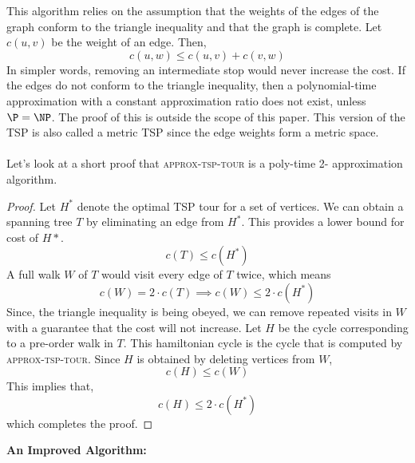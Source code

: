 \documentclass[11pt]{article}
\begin{document}
  This algorithm relies on the assumption that the weights of the edges of the graph conform to the triangle inequality and that the graph is complete.
  Let $c(u,v)$ be the weight of 
  an edge. Then, \[c(u,w) \leq c(u,v) + c(v, w) \]
  In simpler words, removing an intermediate stop would never increase the cost. If the edges do not conform to the triangle inequality, then a polynomial-time approximation
  with a constant approximation ratio does not exist, unless $\P = \NP$. The proof of this
  is outside the scope of this paper. This version of the TSP is also called a metric TSP since 
  the edge weights form a metric space.   
  \paragraph{} Let's look at a short proof that \textsc{approx-tsp-tour} is a poly-time 2- approximation algorithm. 
  \begin{proof}
    Let $H^*$ denote the optimal TSP tour for a set of vertices. We can obtain a spanning tree $T$ by eliminating an edge from 
    $H^*$. This provides a lower bound for cost of $H*$. 
    \[c(T) \leq c(H^*)\] A full walk $W$ of $T$ would visit every edge of $T$ twice, which means   
    \[c(W) = 2\cdot c(T) \implies c(W) \leq 2\cdot c(H^*)\]
  Since, the triangle inequality is being obeyed, we can remove repeated visits in $W$ with a guarantee that 
  the cost will not increase.
  Let $H$ be the cycle corresponding to a pre-order walk in $T$. This hamiltonian cycle is the cycle that is computed by 
  \textsc{approx-tsp-tour}. Since $H$ is obtained by deleting vertices from $W$,
  \[c(H) \leq c(W)\]
  This implies that, \[c(H) \leq 2\cdot c(H^*)\] which completes the proof. 
  \end{proof}

  {\large{\textbf{An Improved Algorithm:}}}  \paragraph{}
  
\end{document}
